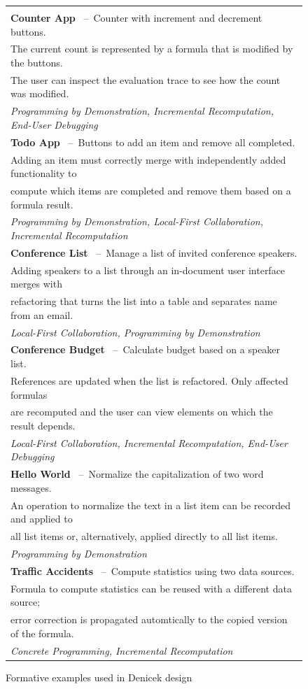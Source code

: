 \documentclass[sigconf,anonymous,screen]{acmart}
\begin{document}
\begin{figure}
\newcommand{\extablecol}[5]{
\small{\bfseries #1} #2\,\; --\,\; #3\\[-0.1em]
\quad \footnotesize #4 \\[-0.2em]
\quad \footnotesize \emph{#5} \\[0.4em]
}

\begin{tabular}{|l|}
\hline
\\[-1em]
\extablecol{Counter App}{\cite{kiss-2014-7guis}}
  {Counter with increment and decrement buttons.}
  {The current count is represented by a formula that is modified by the buttons.\\[-0.2em]\quad\footnotesize
  The user can inspect the evaluation trace to see how the count was modified.}
  {Programming by Demonstration, Incremental Recomputation, End-User Debugging}
\extablecol{Todo App}{\cite{osmani-2024-todomvc}}
  {Buttons to add an item and remove all completed.}
  {Adding an item must correctly merge with independently added functionality to \\[-0.2em]\quad\footnotesize
   compute which items are completed and remove them based on a formula result.}
  {Programming by Demonstration, Local-First Collaboration, Incremental Recomputation}
\extablecol{Conference List}{\cite{edwards-2025-schema}}
  {Manage a list of invited conference speakers.}
  {Adding speakers to a list through an in-document user interface merges with \\[-0.2em]\quad\footnotesize
   refactoring that turns the list into a table and separates name from an email.}
  {Local-First Collaboration, Programming by Demonstration}
\extablecol{Conference Budget}{\cite{edwards-2025-schema}}
  {Calculate budget based on a speaker list.}
  {References are updated  when the list is refactored. Only affected formulas\\[-0.2em]\quad\footnotesize
   are recomputed and the user can view elements on which the result depends.}
  {Local-First Collaboration, Incremental Recomputation, End-User Debugging}
\extablecol{Hello World}{\cite{miller-2001-simult}}
  {Normalize the capitalization of two word messages.}
  {An operation to normalize the text in a list item can be recorded and applied to\\[-0.2em]\quad\footnotesize
   all list items or, alternatively, applied directly to all list items.}
  {Programming by Demonstration}
\extablecol{Traffic Accidents}{\cite{edwards-2022-copypaste}}
  {Compute statistics using two data sources.}
  {Formula to compute statistics can be reused with a different data source;\\[-0.2em]\quad\footnotesize
   error correction is propagated automtically to the copied version of the formula.}
  {Concrete Programming, Incremental Recomputation}
\hline
\end{tabular}

\caption{Formative examples used in Denicek design}
\label{fig:examples}
\vspace{-1em}
\end{figure}
\end{document}
